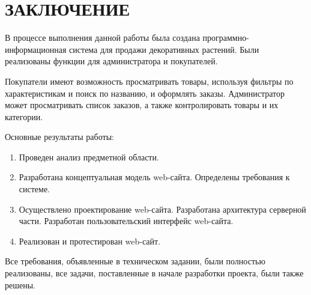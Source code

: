 \section*{ЗАКЛЮЧЕНИЕ}

В процессе выполнения данной работы была создана программно-информационная система для продажи декоративных растений. Были реализованы функции для администратора и покупателей.

Покупатели имеют возможность просматривать товары, используя фильтры по характеристикам и поиск по названию, и оформлять заказы. Администратор может просматривать список заказов, а также  контролировать товары и их категории.

Основные результаты работы:

\begin{enumerate}
	\item Проведен анализ предметной области. 
	\item Разработана концептуальная модель web-сайта. Определены требования к системе.
	\item Осуществлено проектирование web-сайта. Разработана архитектура серверной части. Разработан пользовательский интерфейс web-сайта.
	\item Реализован и протестирован web-сайт.
\end{enumerate}

Все требования, объявленные в техническом задании, были полностью реализованы, все задачи, поставленные в начале разработки проекта, были также решены.


